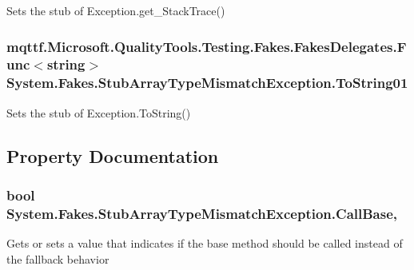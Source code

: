 Sets the stub of Exception.\-get\-\_\-\-Stack\-Trace()

\hypertarget{class_system_1_1_fakes_1_1_stub_array_type_mismatch_exception_ae1c5c1a72d65c843d8623b7c447cda60}{
\subsubsection[{To\-String01}]{\setlength{\rightskip}{0pt plus 5cm}mqttf.\-Microsoft.\-Quality\-Tools.\-Testing.\-Fakes.\-Fakes\-Delegates.\-Func$<$string$>$ System.\-Fakes.\-Stub\-Array\-Type\-Mismatch\-Exception.\-To\-String01}}\label{class_system_1_1_fakes_1_1_stub_array_type_mismatch_exception_ae1c5c1a72d65c843d8623b7c447cda60}


Sets the stub of Exception.\-To\-String()



\subsection{Property Documentation}
\hypertarget{class_system_1_1_fakes_1_1_stub_array_type_mismatch_exception_a2e07e641d1fb1783cbce2894064fa6be}{
\subsubsection[{Call\-Base}]{\setlength{\rightskip}{0pt plus 5cm}bool System.\-Fakes.\-Stub\-Array\-Type\-Mismatch\-Exception.\-Call\-Base\hspace{0.3cm}{\ttfamily [get]}, {\ttfamily [set]}}}\label{class_system_1_1_fakes_1_1_stub_array_type_mismatch_exception_a2e07e641d1fb1783cbce2894064fa6be}


Gets or sets a value that indicates if the base method should be called instead of the fallback behavior

